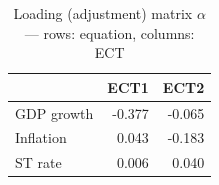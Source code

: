 \begin{table}

\caption{\label{tab:vecm-loadings}Loading (adjustment) matrix $\alpha$ --- rows: equation, columns: ECT}
\centering
\begin{tabular}[t]{lrr}
\toprule
  & ECT1 & ECT2\\
\midrule
GDP growth & -0.377 & -0.065\\
Inflation & 0.043 & -0.183\\
ST rate & 0.006 & 0.040\\
\bottomrule
\end{tabular}
\end{table}
